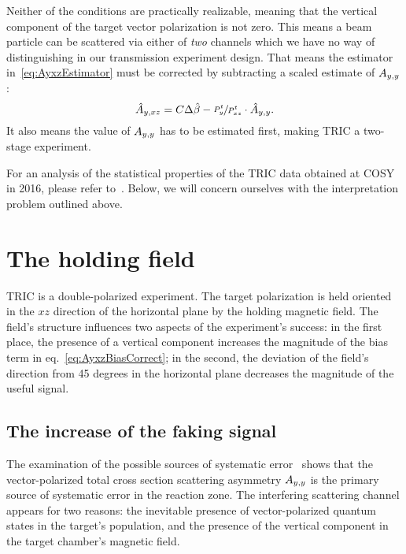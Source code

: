 \documentclass{article}
\begin{document}
Neither of the conditions are practically realizable, meaning that the vertical component of the target vector polarization is not zero. This means a beam particle can be scattered via either of \emph{two} channels which we have no way of distinguishing in our transmission experiment design. That means the estimator in~\eqref{eq:AyxzEstimator} must be corrected by subtracting a scaled estimate of $\Ayy$: 
\begin{equation}\label{eq:AyxzBiasCorrect}
\Ayxz* = C\Delta\slp* - \sfrac{P^t_y}{P^t_{xz}}\cdot\Ayy*.
\end{equation}
It also means the value of $\Ayy$ has to be estimated first, making TRIC a two-stage experiment.

For an analysis of the statistical properties of the TRIC data obtained at COSY in 2016, please refer to~\cite{DAnaRep}. Below, we will concern ourselves with the interpretation problem outlined above.

\section{The holding field}

TRIC is a double-polarized experiment. The target polarization is held oriented in the $xz$ direction of the horizontal plane by the holding magnetic field. The field's structure influences two aspects of the experiment's success: in the first place, the presence of a vertical component increases the magnitude of the bias term in eq.~\eqref{eq:AyxzBiasCorrect}; in the second, the deviation of the field's direction from 45 degrees in the horizontal plane decreases the magnitude of the useful signal.

\subsection{The increase of the faking signal}
The examination of the possible sources of systematic error~\cite{Proposal} shows that the vector-polarized total cross section scattering asymmetry $\Ayy$ is the primary source of systematic error in the reaction zone. The interfering scattering channel appears for two reasons: the inevitable presence of vector-polarized quantum states in the target's population, and the presence of the vertical component in the target chamber's magnetic field. 
\end{document}
